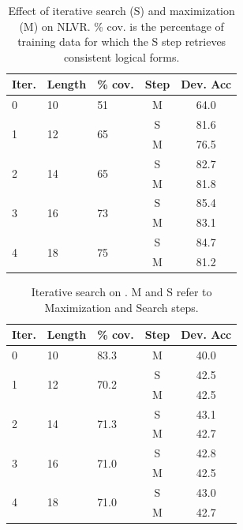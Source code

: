 \begin{table}
    \centering
    \begin{tabular}{lllcc}
    \toprule
        Iter. & Length & \% cov. & Step & Dev. Acc  \\
    \midrule
                         0 & 10 & 51 & M & 64.0 \\
        \hline
        \multirow{2}{*}{1} & \multirow{2}{*}{12} & \multirow{2}{*}{65} & S & 81.6  \\
                           & & &  M & 76.5  \\
        \hline
        \multirow{2}{*}{2} & \multirow{2}{*}{14} & \multirow{2}{*}{65} & S & 82.7  \\
                           & & &  M & 81.8  \\
        \hline
        \multirow{2}{*}{3} & \multirow{2}{*}{16} & \multirow{2}{*}{73} & S & 85.4  \\
                           & & &  M & 83.1  \\
        \hline
        \multirow{2}{*}{4} & \multirow{2}{*}{18} & \multirow{2}{*}{75} & S & 84.7  \\
                           & & &  M & 81.2  \\
    \bottomrule
    \end{tabular}
    \caption{Effect of iterative search (S) and maximization (M) on NLVR. \% cov. is the percentage of training data for which the S step retrieves consistent logical forms.}
    \label{tab:iterative_search_nlvr}
\end{table}

\begin{table}
    \centering
    \begin{tabular}{lllcc}
    \toprule
        Iter. & Length & \% cov. & Step & Dev. Acc  \\
    \midrule
        0 & 10 & 83.3 & M & 40.0  \\
        \hline
        \multirow{2}{*}{1} & \multirow{2}{*}{12} & \multirow{2}{*}{70.2} & S & 42.5    \\
                           & & & M & 42.5    \\
        \hline
        \multirow{2}{*}{2} & \multirow{2}{*}{14} & \multirow{2}{*}{71.3} & S & 43.1    \\
                           & & & M & 42.7    \\
        \hline
        \multirow{2}{*}{3} & \multirow{2}{*}{16} & \multirow{2}{*}{71.0} & S & 42.8    \\
                           & & & M & 42.5    \\
        \hline
        \multirow{2}{*}{4} & \multirow{2}{*}{18} & \multirow{2}{*}{71.0} & S & 43.0    \\
                           & & & M & 42.7    \\
    \bottomrule
    \end{tabular}
    \caption{Iterative search on \WTQ{}.  M and S refer to Maximization and Search steps.}
    \label{tab:iterative_search_wtq}
\end{table}

